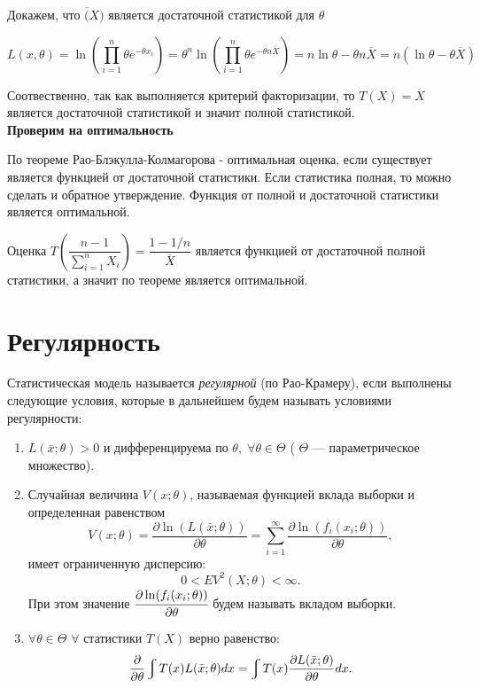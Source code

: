 \documentclass[a4paper,12pt, oneside]{book}
\let\int\varint
\begin{document}
Докажем, что  $ \overline(X) $ является достаточной статистикой для $ \theta $

$$
L(x , \theta) = \ln (\prod\limits_{i = 1}^n \theta e^{-\theta x_i}) = \theta^n \ln(\prod\limits_{i = 1}^n \theta e^{-\theta n \overline{X}}) = n \ln\theta - \theta n \overline{X} = n(\ln \theta - \theta \overline{X} )
$$

Соотвественно, так как выполняется критерий факторизации, то $ T(X) = \overline{X} $ является достаточной статистикой и значит полной статистикой.\\

\textbf{Проверим на оптимальность}

По теореме Рао-Блэкулла-Колмагорова - оптимальная оценка, если существует является функцией от достаточной статистики. Если статистика полная, то можно сделать и обратное утверждение. Функция от полной и достаточной статистики является оптимальной.

Оценка $ T(\dfrac{n -1 }{\sum_{i =1}^{n } X_i}) = \dfrac{1 - 1/n}{\overline{X}} $  является функцией от достаточной полной статистики, а значит по теореме является оптимальной.


\chapter{ Регулярность }

Статистическая модель называется \textit{регулярной} (по Рао-Крамеру), если выполнены следующие условия, которые в дальнейшем будем называть условиями регулярности:


\begin{enumerate}
	\item $L(\bar{x}; \theta) > 0$ и дифференцируема по $\theta, \; \forall \theta \in \Theta$ ( $\Theta$ --- параметрическое множество).
	\item Случайная величина $V(x; \theta)$, называемая функцией вклада выборки и определенная равенством
	\[V(x; \theta) = \frac{\partial \ln (L(\bar{x}; \theta))}{\partial \theta} = \sum \limits_{i = 1}^{\infty} \frac{\partial \ln(f_i(x_i;\theta))}{\partial \theta},\] имеет ограниченную дисперсию:
	\[0 < E V^2(X; \theta) < \infty. \] При этом значение $\cfrac{\partial \ln(f_i(x_i;\theta))}{\partial \theta}$  будем называть вкладом выборки.
	\item $\forall \theta \in \Theta$ $\forall$ статистики $T(X)$ верно равенство:
	\[
	\frac{\partial}{\partial \theta} \int T(x) L(\bar{x}; \theta) dx = \int T(x) \frac{\partial L(\bar{x}; \theta)}{\partial \theta} dx.
	\]
\end{enumerate}
\end{document}
